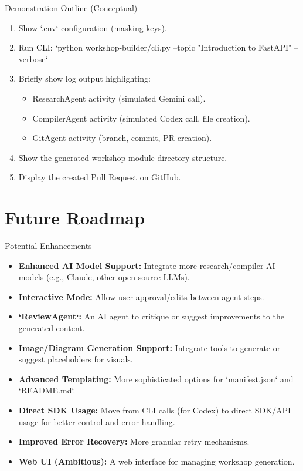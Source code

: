 \documentclass{beamer}
\begin{document}
\begin{frame}{Demonstration Outline (Conceptual)}
    \begin{enumerate}
        \item Show `.env` configuration (masking keys).
        \item Run CLI: `python workshop-builder/cli.py --topic "Introduction to FastAPI" --verbose`
        \item Briefly show log output highlighting:
            \begin{itemize}
                \item ResearchAgent activity (simulated Gemini call).
                \item CompilerAgent activity (simulated Codex call, file creation).
                \item GitAgent activity (branch, commit, PR creation).
            \end{itemize}
        \item Show the generated workshop module directory structure.
        \item Display the created Pull Request on GitHub.
    \end{enumerate}
\end{frame}

\section{Future Roadmap} \label{L_section_roadmap}

\begin{frame}{Potential Enhancements}
    \begin{itemize}
        \item \textbf{Enhanced AI Model Support:} Integrate more research/compiler AI models (e.g., Claude, other open-source LLMs).
        \item \textbf{Interactive Mode:} Allow user approval/edits between agent steps.
        \item \textbf{`ReviewAgent`:} An AI agent to critique or suggest improvements to the generated content.
        \item \textbf{Image/Diagram Generation Support:} Integrate tools to generate or suggest placeholders for visuals.
        \item \textbf{Advanced Templating:} More sophisticated options for `manifest.json` and `README.md`.
        \item \textbf{Direct SDK Usage:} Move from CLI calls (for Codex) to direct SDK/API usage for better control and error handling.
        \item \textbf{Improved Error Recovery:} More granular retry mechanisms.
        \item \textbf{Web UI (Ambitious):} A web interface for managing workshop generation.
    \end{itemize}
\end{frame}
\end{document}
